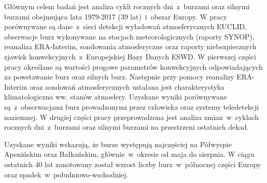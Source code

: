 \documentclass[\main/boa.tex]{subfiles}
\begin{document}
Głównym celem badań jest analiza cykli rocznych dni~z~burzami oraz silnymi burzami obejmująca lata 1979-2017 (39 lat)~i~obszar Europy. W pracy porównywane są dane~z~sieci detekcji wyładowań atmosferycznych EUCLID, obserwacje burz wykonywane na stacjach meteorologicznych (raporty SYNOP), reanaliza ERA-Interim, sondowania atmosferyczne oraz raporty niebezpiecznych zjawisk konwekcyjnych~z~Europejskiej Bazy Danych ESWD. W pierwszej części pracy określane są wartości progowe parametrów konwekcyjnych odpowiadających za powstawanie burz oraz silnych burz. Następnie przy pomocy reanalizy ERA-Interim oraz sondowań atmosferycznych ustalana jest charakterystyka klimatologiczna ww. stanów atmosfery. Uzyskane wyniki porównywane są~z~obserwacjami burz prowadzonymi przez człowieka oraz systemy teledetekcji naziemnej. W drugiej części pracy przeprowadzona jest analiza zmian~w~cyklach rocznych dni~z~burzami oraz silnymi burzami na przestrzeni ostatnich dekad.

 Uzyskane wyniki wskazują, że burze występują najczęściej na Półwyspie Apenińskim oraz Bałkańskim, głównie~w~okresie od maja do sierpnia. W ciągu ostatnich 40 lat zanotowany został wzrost liczby burz~w~północnej części Europy oraz spadek~w~południowo-wschodniej.
\end{document}
